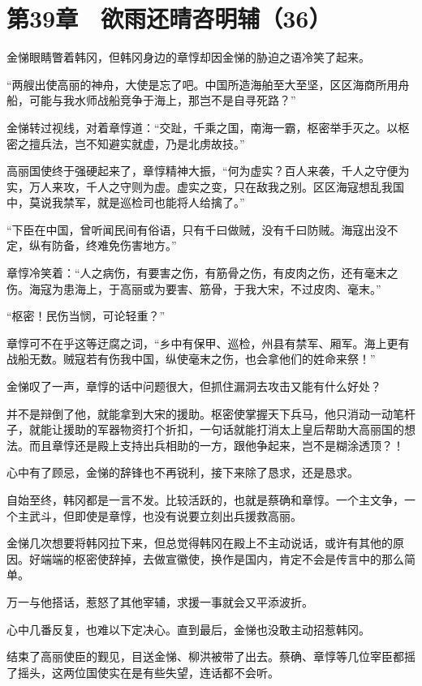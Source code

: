 \section{第39章　欲雨还晴咨明辅（36）}

金悌眼睛瞥着韩冈，但韩冈身边的章惇却因金悌的胁迫之语冷笑了起来。

“两艘出使高丽的神舟，大使是忘了吧。中国所造海舶至大至坚，区区海商所用舟船，可能与我水师战船竞争于海上，那岂不是自寻死路？”

金悌转过视线，对着章惇道：“交趾，千乘之国，南海一霸，枢密举手灭之。以枢密之擅兵法，岂不知避实就虚，乃是北虏故技。”

高丽国使终于强硬起来了，章惇精神大振，“何为虚实？百人来袭，千人之守便为实，万人来攻，千人之守则为虚。虚实之变，只在敌我之别。区区海寇想乱我国中，莫说我禁军，就是巡检司也能将人给擒了。”

“下臣在中国，曾听闻民间有俗语，只有千曰做贼，没有千曰防贼。海寇出没不定，纵有防备，终难免伤害地方。”

章惇冷笑着：“人之病伤，有要害之伤，有筋骨之伤，有皮肉之伤，还有毫末之伤。海寇为患海上，于高丽或为要害、筋骨，于我大宋，不过皮肉、毫末。”

“枢密！民伤当悯，可论轻重？”

章惇可不在乎这等迂腐之词，“乡中有保甲、巡检，州县有禁军、厢军。海上更有战船无数。贼寇若有伤我中国，纵使毫末之伤，也会拿他们的姓命来祭！”

金悌叹了一声，章惇的话中问题很大，但抓住漏洞去攻击又能有什么好处？

并不是辩倒了他，就能拿到大宋的援助。枢密使掌握天下兵马，他只消动一动笔杆子，就能让援助的军器物资打个折扣，一句话就能打消太上皇后帮助大高丽国的想法。而且章惇还是殿上支持出兵相助的一方，跟他争起来，岂不是糊涂透顶？！

心中有了顾忌，金悌的辞锋也不再锐利，接下来除了恳求，还是恳求。

自始至终，韩冈都是一言不发。比较活跃的，也就是蔡确和章惇。一个主文争，一个主武斗，但即使是章惇，也没有说要立刻出兵援救高丽。

金悌几次想要将韩冈拉下来，但总觉得韩冈在殿上不主动说话，或许有其他的原因。好端端的枢密使辞掉，去做宣徽使，换作是国内，肯定不会是传言中的那么简单。

万一与他搭话，惹怒了其他宰辅，求援一事就会又平添波折。

心中几番反复，也难以下定决心。直到最后，金悌也没敢主动招惹韩冈。

结束了高丽使臣的觐见，目送金悌、柳洪被带了出去。蔡确、章惇等几位宰臣都摇了摇头，这两位国使实在是有些失望，连话都不会听。

